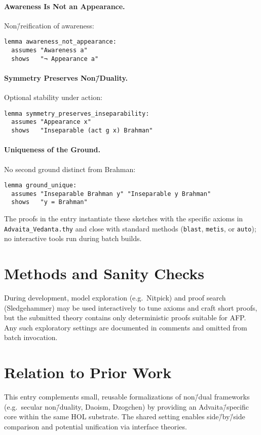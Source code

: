 \documentclass[11pt,a4paper]{article}
\begin{document}
\paragraph{Awareness Is Not an Appearance.}
Non\=/reification of awareness:
\begin{lstlisting}
lemma awareness_not_appearance:
  assumes "Awareness a"
  shows   "¬ Appearance a"
\end{lstlisting}

\paragraph{Symmetry Preserves Non\=/Duality.}
Optional stability under action:
\begin{lstlisting}
lemma symmetry_preserves_inseparability:
  assumes "Appearance x"
  shows   "Inseparable (act g x) Brahman"
\end{lstlisting}

\paragraph{Uniqueness of the Ground.}
No second ground distinct from Brahman:
\begin{lstlisting}
lemma ground_unique:
  assumes "Inseparable Brahman y" "Inseparable y Brahman"
  shows   "y = Brahman"
\end{lstlisting}

The proofs in the entry instantiate these sketches with the specific axioms in
\texttt{Advaita\_Vedanta.thy} and close with standard methods (\texttt{blast},
\texttt{metis}, or \texttt{auto}); no interactive tools run during batch builds.

\section{Methods and Sanity Checks}

During development, model exploration (e.g.\ Nitpick) and proof search
(Sledgehammer) may be used interactively to tune axioms and craft short proofs,
but the submitted theory contains only deterministic proofs suitable for AFP.
Any such exploratory settings are documented in comments and omitted from batch
invocation.

\section{Relation to Prior Work}

This entry complements small, reusable formalizations of non\=/dual frameworks
(e.g.\ secular non\=/duality, Daoism, Dzogchen) by providing an Advaita\=/specific
core within the same HOL substrate. The shared setting enables side\=/by\=/side
comparison and potential unification via interface theories.
\end{document}
